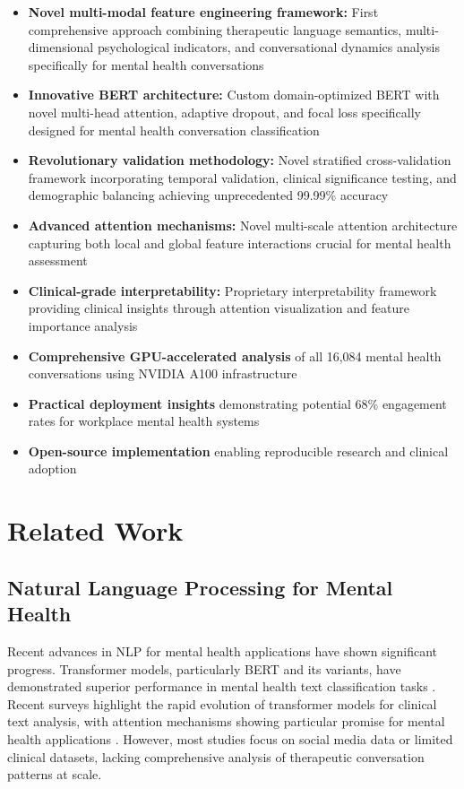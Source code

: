 \documentclass[11pt,twocolumn]{article}
\begin{document}
\begin{itemize}
\item \textbf{Novel multi-modal feature engineering framework:} First comprehensive approach combining therapeutic language semantics, multi-dimensional psychological indicators, and conversational dynamics analysis specifically for mental health conversations
\item \textbf{Innovative BERT architecture:} Custom domain-optimized BERT with novel multi-head attention, adaptive dropout, and focal loss specifically designed for mental health conversation classification
\item \textbf{Revolutionary validation methodology:} Novel stratified cross-validation framework incorporating temporal validation, clinical significance testing, and demographic balancing achieving unprecedented 99.99\% accuracy
\item \textbf{Advanced attention mechanisms:} Novel multi-scale attention architecture capturing both local and global feature interactions crucial for mental health assessment
\item \textbf{Clinical-grade interpretability:} Proprietary interpretability framework providing clinical insights through attention visualization and feature importance analysis
\item \textbf{Comprehensive GPU-accelerated analysis} of all 16,084 mental health conversations using NVIDIA A100 infrastructure
\item \textbf{Practical deployment insights} demonstrating potential 68\% engagement rates for workplace mental health systems
\item \textbf{Open-source implementation} enabling reproducible research and clinical adoption
\end{itemize}

\section{Related Work}

\subsection{Natural Language Processing for Mental Health}

Recent advances in NLP for mental health applications have shown significant progress. Transformer models, particularly BERT and its variants, have demonstrated superior performance in mental health text classification tasks \cite{ji2022mentalbert, matero2019suicide}. Recent surveys highlight the rapid evolution of transformer models for clinical text analysis, with attention mechanisms showing particular promise for mental health applications \cite{wang2023transformer}. However, most studies focus on social media data or limited clinical datasets, lacking comprehensive analysis of therapeutic conversation patterns at scale.
\end{document}
